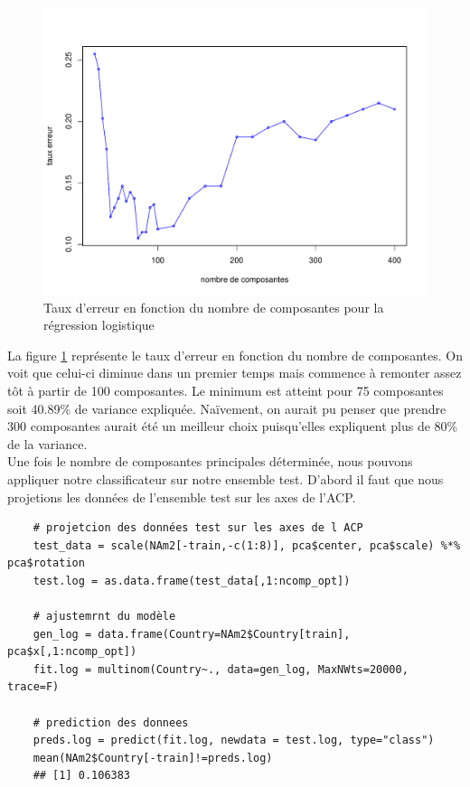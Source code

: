 \documentclass[12pt,a4paper]{article}
\begin{document}
\begin{figure}[h!]
	\begin{center}
		\includegraphics[scale=0.5]{figures/nopt_log.pdf}
		\caption{Taux d'erreur en fonction du nombre de composantes pour la régression logistique}
		\label{fig:nopt_log}
	\end{center}
\end{figure}
La figure \ref{fig:nopt_log} représente le taux d'erreur en fonction du nombre de composantes. On voit que celui-ci diminue dans un premier temps mais commence à remonter assez tôt à partir de 100 composantes. Le minimum est atteint pour 75 composantes soit 40.89\% de variance expliquée. Naïvement, on aurait pu penser que prendre 300 composantes aurait été un meilleur choix puisqu'elles expliquent plus de 80\% de la variance.\vspace{3mm}\\
Une fois le nombre de composantes principales déterminée, nous pouvons appliquer notre classificateur sur notre ensemble test. D'abord il faut que nous projetions les données de l'ensemble test sur les axes de l'ACP.
\begin{lstlisting}
	# projetcion des données test sur les axes de l ACP
	test_data = scale(NAm2[-train,-c(1:8)], pca$center, pca$scale) %*% pca$rotation
	test.log = as.data.frame(test_data[,1:ncomp_opt])
	
	# ajustemrnt du modèle
	gen_log = data.frame(Country=NAm2$Country[train], pca$x[,1:ncomp_opt])
	fit.log = multinom(Country~., data=gen_log, MaxNWts=20000, trace=F)
	
	# prediction des donnees
	preds.log = predict(fit.log, newdata = test.log, type="class")
	mean(NAm2$Country[-train]!=preds.log)
	## [1] 0.106383
\end{lstlisting}
\end{document}
